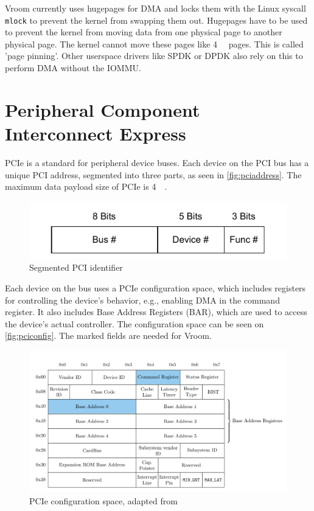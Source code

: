 Vroom currently uses hugepages for DMA and locks them with the Linux syscall \texttt{mlock} to prevent the kernel from swapping them out.
Hugepages have to be used to prevent the kernel from moving data from one physical page to another physical page. The kernel cannot move these pages like \qty{4}{\kibi\byte} pages. This is called 'page pinning'. Other userspace drivers like SPDK or DPDK also rely on this to perform DMA without the IOMMU.

\section{Peripheral Component Interconnect Express}
PCIe is a standard for peripheral device buses. Each device on the PCI bus has a unique PCI address, segmented into three parts, as seen in \autoref{fig:pciaddress}. The maximum data payload size of PCIe is \qty{4}{\kibi\byte}.

\begin{figure}[H]
    \centering
    \includegraphics[width=.7\textwidth]{figures/pciaddress.pdf}
    \caption{Segmented PCI identifier}
    \label{fig:pciaddress}
\end{figure}

Each device on the bus uses a PCIe configuration space, which includes registers for controlling the device's behavior, e.g., enabling DMA in the command register. It also includes Base Address Registers (BAR), which are used to access the device's actual controller. The configuration space can be seen on \autoref{fig:pciconfig}. The marked fields are needed for Vroom.

\begin{figure}[H]
    \centering
    \includegraphics[width=\textwidth]{figures/pcie-config-space}
    \caption{PCIe configuration space, adapted from \cite{vroom}}
    \label{fig:pciconfig}
\end{figure}

